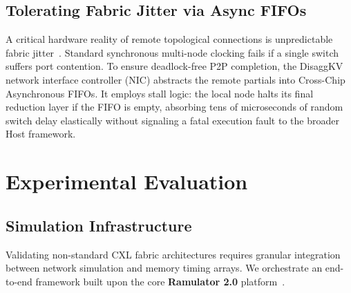 \documentclass[10pt,conference]{IEEEtran}
\begin{document}
\subsection{Tolerating Fabric Jitter via Async FIFOs}
A critical hardware reality of remote topological connections is unpredictable fabric jitter~\cite{hpc_network}. Standard synchronous multi-node clocking fails if a single switch suffers port contention. To ensure deadlock-free P2P completion, the DisaggKV network interface controller (NIC) abstracts the remote partials into Cross-Chip Asynchronous FIFOs. It employs stall logic: the local node halts its final reduction layer if the FIFO is empty, absorbing tens of microseconds of random switch delay elastically without signaling a fatal execution fault to the broader Host framework.

\section{Experimental Evaluation}

\subsection{Simulation Infrastructure}
Validating non-standard CXL fabric architectures requires granular integration between network simulation and memory timing arrays. We orchestrate an end-to-end framework built upon the core \textbf{Ramulator 2.0} platform~\cite{ramulator2}. 
\end{document}
